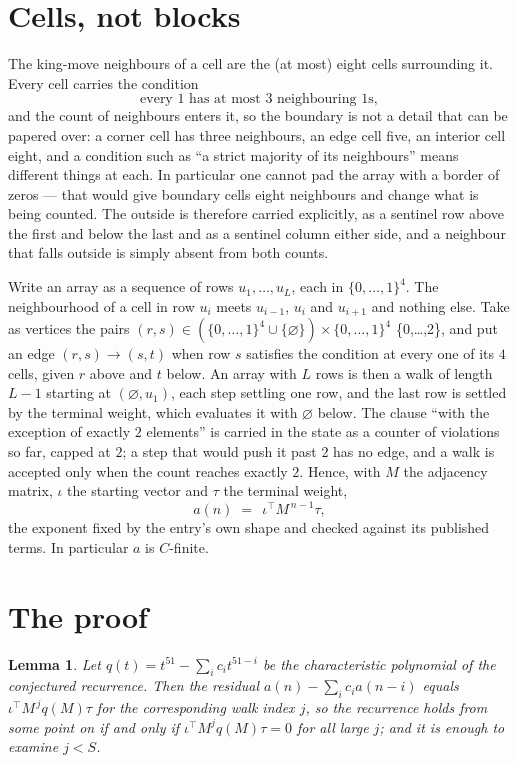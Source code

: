 \documentclass[11pt,a4paper]{article}
\theoremstyle{plain}
\newtheorem{lemma}[theorem]{Lemma}
\theoremstyle{definition}
\begin{document}
\section{Cells, not blocks}

The king-move neighbours of a cell are the (at most) eight cells surrounding it. Every cell
carries the condition
\[
\text{every }1\text{ has at most }3\text{ neighbouring }1\text{s},
\]
and the count of neighbours enters it, so the boundary is not a detail that can be papered
over: a corner cell has three neighbours, an edge cell five, an interior cell eight, and a
condition such as ``a strict majority of its neighbours'' means different things at each. In
particular one cannot pad the array with a border of zeros --- that would give boundary cells
eight neighbours and change what is being counted. The outside is therefore carried
explicitly, as a sentinel row above the first and below the last and as a sentinel column
either side, and a neighbour that falls outside is simply absent from both counts.

Write an array as a sequence of rows $u_1,\dots,u_L$, each in
$\{0,\dots,1\}^{4}$. The neighbourhood of a cell in row $u_i$ meets $u_{i-1}$,
$u_i$ and $u_{i+1}$ and nothing else. Take as vertices the pairs
$(r,s)\in(\{0,\dots,1\}^{4}\cup\{\varnothing\})\times\{0,\dots,1\}^{4}$ \times \{0,\dots,2\},
and put an edge $(r,s)\to(s,t)$ when row $s$ satisfies the condition at every one of its
$4$ cells, given $r$ above and $t$ below. An array with $L$ rows is then a walk of length
$L-1$ starting at $(\varnothing,u_1)$, each step settling one row, and the last row is
settled by the terminal weight, which evaluates it with $\varnothing$ below. The clause ``with the exception of exactly $2$ elements'' is carried in
the state as a counter of violations so far, capped at $2$; a step that would push it past
$2$ has no edge, and a walk is accepted only when the count reaches exactly $2$. Hence,
with $M$ the adjacency matrix, $\iota$ the starting vector and $\tau$ the terminal weight,
\[
a(n)\;=\;\,\iota^{\!\top}M^{\,n-1}\tau ,
\]
the exponent fixed by the entry's own shape and checked against its published terms. In
particular $a$ is $C$-finite.

\section{The proof}

\begin{lemma}\label{lem:crit}
Let $q(t)=t^{51}-\sum_i c_it^{51-i}$ be the characteristic polynomial of the
conjectured recurrence. Then the residual $a(n)-\sum_ic_ia(n-i)$ equals
$\iota^{\!\top}M^{\,j}q(M)\tau$ for the corresponding walk index $j$, so the
recurrence holds from some point on if and only if $\iota^{\!\top}M^{j}q(M)\tau=0$ for all
large $j$; and it is enough to examine $j<S$.
\end{lemma}
\end{document}
